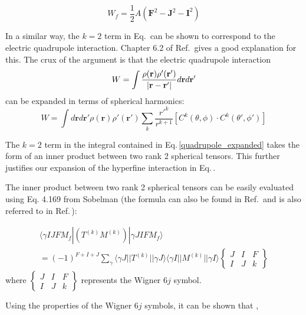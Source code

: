 \begin{equation}\label{Wf_dot_product}
W_f=\frac{1}{2}A(\mathbf{F}^2-\mathbf{J}^2-\mathbf{I}^2)
\end{equation}

In a similar way, the $k=2$ term in Eq.\,\label{TkMk_hyperfine} can be shown to correspond to the electric quadrupole interaction. Chapter 6.2 of Ref.\,\cite{sobelman_spectra} gives a good explanation for this. The crux of the argument is that the electric quadrupole interaction  
\begin{equation}
W=\int\frac{\rho(\mathbf{r})\rho'(\mathbf{r}')}{|\mathbf{r}-\mathbf{r}'|}d\mathbf{r}d\mathbf{r'}\\
\end{equation}
can  be expanded in terms of spherical harmonics: 
\begin{equation}
W=\int d\mathbf{r}d\mathbf{r'}
\rho(\mathbf{r})\rho'(\mathbf{r}')\sum_k \frac{r'^k}{r^{k+1}}[C^k(\theta,\phi)\cdot C^k(\theta',\phi')] \label{quadrupole_expanded}
\end{equation}

The $k=2$ term in the integral contained in Eq.\,\ref{quadrupole_expanded} takes the form of an inner product between two rank 2 spherical tensors. This further justifies our expansion of the hyperfine interaction in Eq.\,\cite{TkMk_hyperfine}.

The inner product between two rank 2 spherical tensors can be easily evaluated using Eq. 4.169 from Sobelman \cite{sobelman_spectra} (the formula can also be found in Ref.\,\cite{Racah2} and is also referred to in Ref.\,\cite{schwartz_hyperfine_expansion}):

\begin{multline}\label{4169_combine_diff_tensors}
\langle\gamma I J F M_f|(T^{(k)}M^{(k)})|\gamma J I F M_f\rangle \\
=
(-1)^{F+I+J} \sum_{\gamma} \langle\gamma J||T^{(k)}||\gamma J\rangle
\langle\gamma I || M^{(k)} ||\gamma I\rangle
\begin{Bmatrix}
J & I & F \\
I & J & k
\end{Bmatrix}
\end{multline}
where 
$\begin{Bmatrix}
J & I & F \\
I & J & k
\end{Bmatrix}$ represents the Wigner $6j$ symbol. 

Using the properties of the Wigner $6j$ symbols, it can be shown that \cite{cuaMITnotes}\cite{sobelman_spectra}, 

